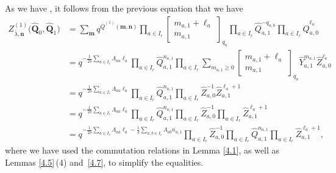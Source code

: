 \documentclass[10pt,a4paper]{amsart}
\numberwithin{equation}{section}
\begin{document}
As we have , it follows from the previous equation that we have
\begin{align}
Z_{\overline{\lambda},\mathbf{n}}^{(1)}\bigl(\widehat{\mathbf{Q}}_0,\widehat{\mathbf{Q}}_1\bigr)
&=\sum_{\mathbf{m}}q^{\overline{Q}^{(1)}(\mathbf{m},\mathbf{n})}\prod_{a\in I_r}\begin{bmatrix}m_{a,1}+\ell_a\\m_{a,1}\end{bmatrix}_{q_a}\prod_{a\in I_r}\widehat{Q}_{a,1}^{-q_{a,0}}\prod_{a\in I_r}\widehat{Q}_{a,0}^{\ell_a}\nonumber\\
&=q^{-\frac{1}{2\delta}\sum_{a\in I_r}\Lambda_{aa}\ell_a}\prod_{a\in I_r}\widehat{Q}_{a,1}^{n_{a,1}}\prod_{a\in I_r}\sum_{m_{a,1}\geq0}\begin{bmatrix}m_{a,1}+\ell_a\\m_{a,1}\end{bmatrix}_{q_a}\widehat{Y}_{a,1}^{m_{a,1}}\widehat{Z}_{a,0}^{\ell_a}\nonumber\\
&=q^{-\frac{1}{2\delta}\sum_{a\in I_r}\Lambda_{aa}\ell_a}\prod_{a\in I_r}\widehat{Q}_{a,1}^{n_{a,1}}\prod_{a\in I_r}\widehat{Z}_{a,0}^{-1}\widehat{Z}_{a,1}^{\ell_a+1}\nonumber\\
&=q^{-\frac{1}{2\delta}\sum_{a\in I_r}\Lambda_{aa}\ell_a}\prod_{a\in I_r}\widehat{Q}_{a,1}^{n_{a,1}}\prod_{a\in I_r}\widehat{Z}_{a,0}^{-1}\prod_{a\in I_r}\widehat{Z}_{a,1}^{\ell_a+1}\nonumber\\
&=q^{-\frac{1}{2\delta}\sum_{a\in I_r}\Lambda_{aa}\ell_a-\frac{1}{\delta}\sum_{a,b\in I_r}\Lambda_{ab}n_{a,1}}\prod_{a\in I_r}\widehat{Z}_{a,0}^{-1}\prod_{a\in I_r}\widehat{Q}_{a,1}^{n_{a,1}}\prod_{a\in I_r}\widehat{Z}_{a,1}^{\ell_a+1},\label{eq:4.17}
\end{align}
where we have used the commutation relations in Lemma \ref{4.1}, as well as Lemmas \ref{4.5}\,(4) and~\ref{4.7}, to simplify the equalities.
\end{document}
